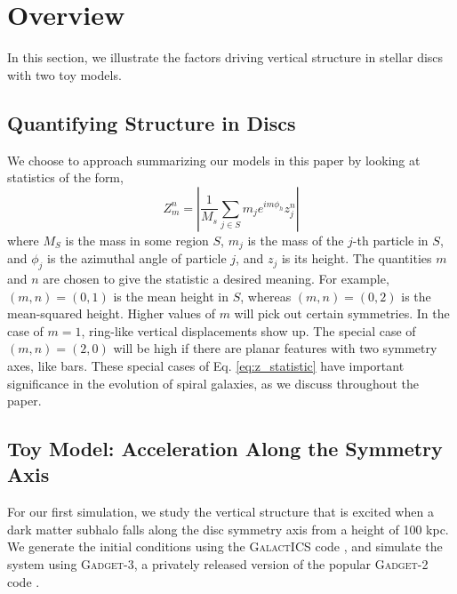 \section{Overview} \label{sec:overview}


In this section, we illustrate the factors driving vertical structure in stellar discs with two toy models.
\subsection{Quantifying Structure in Discs}
We choose to approach summarizing our models in this paper by looking at statistics of the form,
\begin{equation}
Z_m^n  = \left \vert \frac{1}{M_s} \sum_{j \in S} m_j e^{i m \phi_h} z^n_j \right\vert \label{eq:z_statistic}
\end{equation}
where $M_S$ is the mass in some region $S$, $m_j$ is the mass of the $j$-th particle in $S$, and $\phi_j$ is the azimuthal angle of particle $j$, and $z_j$ is its height. The quantities $m$ and $n$ are chosen to give the statistic a desired meaning. For example, $(m,n) = (0,1)$ is the mean height in $S$, whereas $(m,n) = (0,2)$ is the mean-squared height. Higher values of $m$ will pick out certain symmetries. In the case of $m=1$, ring-like vertical displacements show up. The special case of $(m,n) = (2,0)$ will be high if there are planar features with two symmetry axes, like bars. These special cases of Eq. \eqref{eq:z_statistic} have important significance in the evolution of spiral galaxies, as we discuss throughout the paper.
\\



\subsection{Toy Model: Acceleration Along the Symmetry Axis} \label{ssec:toy_model_1}


For our first simulation, we study the vertical structure that is excited when a dark matter subhalo falls along the disc symmetry axis from a height of 100 kpc.  We generate the initial conditions using  the \textsc{GalactICS} code \citep{KGGalactICSReference,WPDGalactICSReference}, and simulate the system using \textsc{Gadget-3}, a privately released version of the popular \textsc{Gadget-2} code \citep{GadgetCodePaper}.

